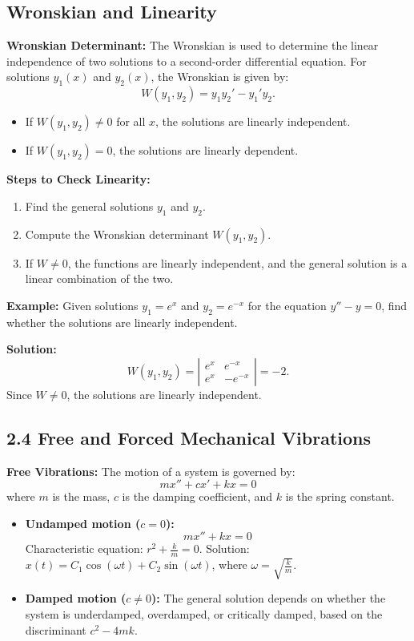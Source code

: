\documentclass[10pt]{article}
\begin{document}
\subsection*{Wronskian and Linearity}
\textbf{Wronskian Determinant:} The Wronskian is used to determine the linear independence of two solutions to a second-order differential equation. For solutions \( y_1(x) \) and \( y_2(x) \), the Wronskian is given by:
\[
W(y_1, y_2) = y_1 y_2' - y_1' y_2.
\]
\begin{itemize}
    \item If \( W(y_1, y_2) \neq 0 \) for all \( x \), the solutions are linearly independent.
    \item If \( W(y_1, y_2) = 0 \), the solutions are linearly dependent.
\end{itemize}

\textbf{Steps to Check Linearity:}
\begin{enumerate}
    \item Find the general solutions \( y_1 \) and \( y_2 \).
    \item Compute the Wronskian determinant \( W(y_1, y_2) \).
    \item If \( W \neq 0 \), the functions are linearly independent, and the general solution is a linear combination of the two.
\end{enumerate}

\textbf{Example:} Given solutions \( y_1 = e^x \) and \( y_2 = e^{-x} \) for the equation \( y'' - y = 0 \), find whether the solutions are linearly independent.

\textbf{Solution:}
\[
W(y_1, y_2) = \left| \begin{matrix} e^x & e^{-x} \\ e^x & -e^{-x} \end{matrix} \right| = -2.
\]
Since \( W \neq 0 \), the solutions are linearly independent.

\subsection*{2.4 Free and Forced Mechanical Vibrations}
\textbf{Free Vibrations:} The motion of a system is governed by:
\[
mx'' + cx' + kx = 0
\]
where \( m \) is the mass, \( c \) is the damping coefficient, and \( k \) is the spring constant.

\begin{itemize}
    \item \textbf{Undamped motion (\( c = 0 \)):}
    \[
    mx'' + kx = 0
    \]
    Characteristic equation: \( r^2 + \frac{k}{m} = 0 \). Solution: \( x(t) = C_1 \cos(\omega t) + C_2 \sin(\omega t) \), where \( \omega = \sqrt{\frac{k}{m}} \).
    
    \item \textbf{Damped motion (\( c \neq 0 \)):}
    The general solution depends on whether the system is underdamped, overdamped, or critically damped, based on the discriminant \( c^2 - 4mk \).
\end{itemize}
\end{document}

